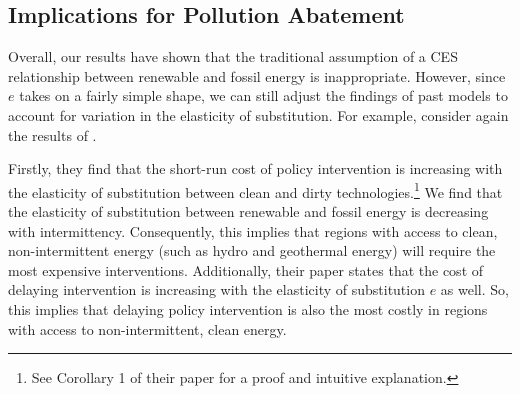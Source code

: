 \documentclass[11pt,a4paper]{extarticle}
\begin{document}






 
\subsection{Implications for Pollution Abatement}

Overall, our results have shown that the traditional assumption of a CES relationship between renewable and fossil energy is inappropriate. However, since $e$ takes on a fairly simple shape, we can still adjust the findings of past models to account for variation in the elasticity of substitution. For example, consider again the results of \citet{Ace2012}. 

Firstly, they find that the short-run cost of policy intervention is increasing with the elasticity of substitution between clean and dirty technologies.\footnote{ See Corollary 1 of their paper for a proof and intuitive explanation.} We find that the elasticity of substitution between renewable and fossil energy is decreasing with intermittency. Consequently, this implies that regions with access to clean, non-intermittent energy (such as hydro and geothermal energy) will require the most expensive interventions. Additionally, their paper states that the cost of delaying intervention is increasing with the elasticity of substitution $e$ as well. So, this implies that delaying policy intervention is also the most costly in regions with access to non-intermittent, clean energy.  
\end{document}
